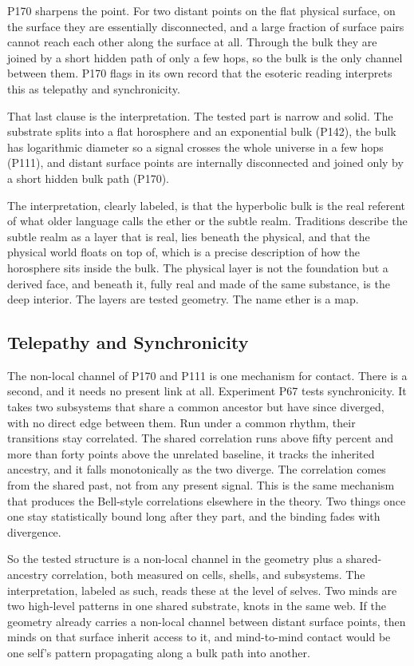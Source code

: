 P170 sharpens the point. For two distant points on the flat physical surface, on the surface they are essentially disconnected, and a large fraction of surface pairs cannot reach each other along the surface at all. Through the bulk they are joined by a short hidden path of only a few hops, so the bulk is the only channel between them. P170 flags in its own record that the esoteric reading interprets this as telepathy and synchronicity.

That last clause is the interpretation. The tested part is narrow and solid. The substrate splits into a flat horosphere and an exponential bulk (P142), the bulk has logarithmic diameter so a signal crosses the whole universe in a few hops (P111), and distant surface points are internally disconnected and joined only by a short hidden bulk path (P170).

The interpretation, clearly labeled, is that the hyperbolic bulk is the real referent of what older language calls the ether or the subtle realm. Traditions describe the subtle realm as a layer that is real, lies beneath the physical, and that the physical world floats on top of, which is a precise description of how the horosphere sits inside the bulk. The physical layer is not the foundation but a derived face, and beneath it, fully real and made of the same substance, is the deep interior. The layers are tested geometry. The name ether is a map.

\subsection{Telepathy and Synchronicity}

The non-local channel of P170 and P111 is one mechanism for contact. There is a second, and it needs no present link at all. Experiment P67 tests synchronicity. It takes two subsystems that share a common ancestor but have since diverged, with no direct edge between them. Run under a common rhythm, their transitions stay correlated. The shared correlation runs above fifty percent and more than forty points above the unrelated baseline, it tracks the inherited ancestry, and it falls monotonically as the two diverge. The correlation comes from the shared past, not from any present signal. This is the same mechanism that produces the Bell-style correlations elsewhere in the theory. Two things once one stay statistically bound long after they part, and the binding fades with divergence.

So the tested structure is a non-local channel in the geometry plus a shared-ancestry correlation, both measured on cells, shells, and subsystems. The interpretation, labeled as such, reads these at the level of selves. Two minds are two high-level patterns in one shared substrate, knots in the same web. If the geometry already carries a non-local channel between distant surface points, then minds on that surface inherit access to it, and mind-to-mind contact would be one self's pattern propagating along a bulk path into another.

